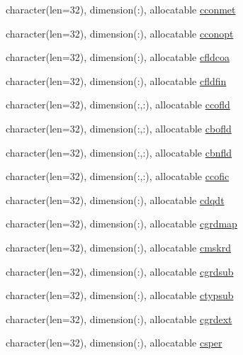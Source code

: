 \begin{DoxyCompactItemize}
character(len=32), dimension(\+:), allocatable \hyperlink{namespacemod__oasis__namcouple_ab7acfd03f0ce869ef05140629f9cefba}{cconmet}
\item 
character(len=32), dimension(\+:), allocatable \hyperlink{namespacemod__oasis__namcouple_a5081df8bbd2ac2fef59fea540a21085f}{cconopt}
\item 
character(len=32), dimension(\+:), allocatable \hyperlink{namespacemod__oasis__namcouple_ade62d9a196cb7afbfd082442bfb80707}{cfldcoa}
\item 
character(len=32), dimension(\+:), allocatable \hyperlink{namespacemod__oasis__namcouple_a4621ff35a33e57ca753e899cae7c9fff}{cfldfin}
\item 
character(len=32), dimension(\+:,\+:), allocatable \hyperlink{namespacemod__oasis__namcouple_ae25142b256fc084c542bd1c8ae776a85}{ccofld}
\item 
character(len=32), dimension(\+:,\+:), allocatable \hyperlink{namespacemod__oasis__namcouple_a600d1a6024b9e5895ae4d53bbf465269}{cbofld}
\item 
character(len=32), dimension(\+:,\+:), allocatable \hyperlink{namespacemod__oasis__namcouple_ab202dc43ea09f2b21fb0152c971a3e65}{cbnfld}
\item 
character(len=32), dimension(\+:,\+:), allocatable \hyperlink{namespacemod__oasis__namcouple_aa1ced7ffb831c65667b2d7b82e5b6187}{ccofic}
\item 
character(len=32), dimension(\+:), allocatable \hyperlink{namespacemod__oasis__namcouple_ae5b2227e6add5cbb7281030353c13a48}{cdqdt}
\item 
character(len=32), dimension(\+:), allocatable \hyperlink{namespacemod__oasis__namcouple_a6a86cf4b0f404b86ea40fee517ae41d2}{cgrdmap}
\item 
character(len=32), dimension(\+:), allocatable \hyperlink{namespacemod__oasis__namcouple_a8872c4a8cdff16451ef7d8af02e39358}{cmskrd}
\item 
character(len=32), dimension(\+:), allocatable \hyperlink{namespacemod__oasis__namcouple_aeadda41d70a777c38f17d845dd429385}{cgrdsub}
\item 
character(len=32), dimension(\+:), allocatable \hyperlink{namespacemod__oasis__namcouple_aa82cea995f7a2c9fd7bfd3703a4593d1}{ctypsub}
\item 
character(len=32), dimension(\+:), allocatable \hyperlink{namespacemod__oasis__namcouple_aab6ce52f64264c8a693b8c4ad24b04cb}{cgrdext}
\item 
character(len=32), dimension(\+:), allocatable \hyperlink{namespacemod__oasis__namcouple_ab91b4542e45eb52edda3b841dcfba553}{csper}

\end{DoxyCompactItemize}
